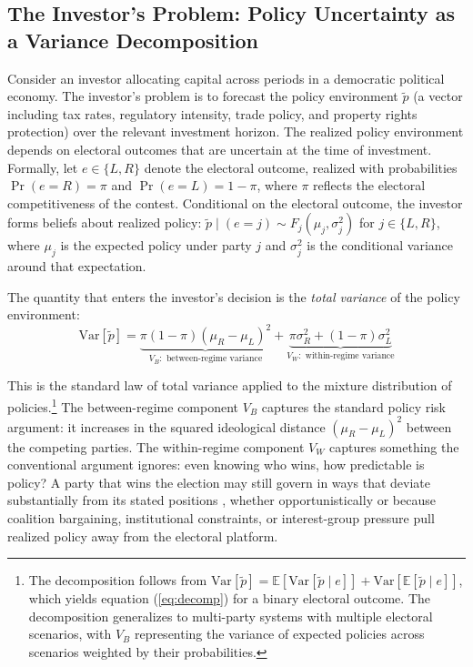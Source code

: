 \documentclass[12pt]{article}
\begin{document}
\subsection{The Investor's Problem: Policy Uncertainty as a Variance
Decomposition}

Consider an investor allocating capital across periods in a democratic
political economy. The investor's problem is to forecast the policy
environment $\tilde{p}$ (a vector including tax rates, regulatory
intensity, trade policy, and property rights protection) over the relevant
investment horizon. The realized policy environment depends on electoral
outcomes that are uncertain at the time of investment. Formally, let $e \in
\{L, R\}$ denote the electoral outcome, realized with probabilities
$\Pr(e = R) = \pi$ and $\Pr(e = L) = 1 - \pi$, where $\pi$ reflects the
electoral competitiveness of the contest. Conditional on the electoral
outcome, the investor forms beliefs about realized policy: $\tilde{p} \mid
(e = j) \sim F_j(\mu_j, \sigma_j^2)$ for $j \in \{L, R\}$, where $\mu_j$
is the expected policy under party $j$ and $\sigma_j^2$ is the conditional
variance around that expectation.

The quantity that enters the investor's decision is the \textit{total
variance} of the policy environment:
\begin{equation}
\label{eq:decomp}
\textstyle\text{Var}[\tilde{p}] = \underbrace{\pi(1-\pi)(\mu_R - \mu_L)^2}_{V_B:
\text{ between-regime variance}} + \underbrace{\pi\sigma_R^2 +
(1-\pi)\sigma_L^2}_{V_W: \text{ within-regime variance}}
\end{equation}

\noindent This is the standard law of total variance applied to the mixture
distribution of policies.\footnote{The decomposition follows from
$\text{Var}[\tilde{p}] = \mathbb{E}[\text{Var}[\tilde{p}\mid e]] +
\text{Var}[\mathbb{E}[\tilde{p}\mid e]]$, which yields equation
(\ref{eq:decomp}) for a binary electoral outcome. The decomposition
generalizes to multi-party systems with multiple electoral scenarios, with
$V_B$ representing the variance of expected policies across scenarios weighted
by their probabilities.} The between-regime component $V_B$ captures the
standard policy risk argument: it increases in the squared ideological
distance $(\mu_R - \mu_L)^2$ between the competing parties. The within-regime
component $V_W$ captures something the conventional argument ignores: even
knowing who wins, how predictable is policy? A party that wins the election
may still govern in ways that deviate substantially from its stated positions
, whether opportunistically or because coalition bargaining, institutional
constraints, or interest-group pressure pull realized policy away from the
electoral platform.
\end{document}
